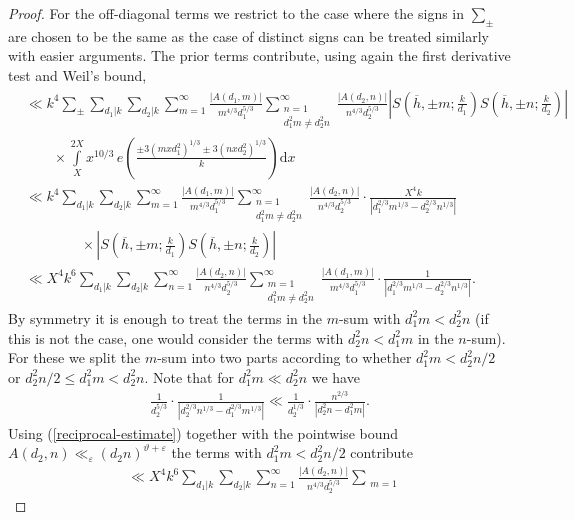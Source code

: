 \documentclass[a4paper,10pt,twoside]{amsart}
\theoremstyle{definition}
\numberwithin{equation}{section}
\renewcommand\:{\colon}
\begin{document}
\begin{proof}
For the off-diagonal terms we restrict to the case where the signs in $\sum_\pm$ are chosen to be the same as the case of distinct signs can be treated similarly with easier arguments. The prior terms contribute, using again the first derivative test and Weil's bound,
\begin{align*}
&\ll k^4\sum_\pm\sum_{d_1|k}\sum_{d_2|k}\sum_{m=1}^\infty\frac{\left|A(d_1,m)\right|}{m^{4/3}d_1^{5/3}}\sum_{\substack{n=1\\
d_1^2m\neq d_2^2n}}^\infty\frac{\left|A(d_2,n)\right|}{n^{4/3}d_2^{5/3}}\left|S\left(\overline h,\pm m;\frac k{d_1}\right)S\left(\overline h,\pm n;\frac k{d_2}\right)\right|\\
&\qquad\times\int\limits_X^{2X}x^{10/3}\,e\left(\frac{\pm 3(mx d_1^2)^{1/3}\pm 3(nxd_2^2)^{1/3}}k\right)\mathrm dx\\
&\ll k^4\sum_{d_1|k}\sum_{d_2|k}\sum_{m=1}^\infty\frac{\left|A(d_1,m)\right|}{m^{4/3}d_1^{5/3}}\sum_{\substack{n=1\\
d_1^2m\neq d_2^2n}}^\infty\frac{\left|A(d_2,n)\right|}{n^{4/3}d_2^{5/3}}\cdot\frac{X^{4}k}{\left|d_1^{2/3}m^{1/3}-d_2^{2/3}n^{1/3}\right|}\\
&\qquad\qquad\times\left|S\left(\overline h,\pm m;\frac k{d_1}\right)S\left(\overline h,\pm n;\frac k{d_2}\right)\right|\\
&\ll X^{4}k^6\sum_{d_1|k}\sum_{d_2|k}\sum_{n=1}^\infty\frac{\left|A(d_2,n)\right|}{n^{4/3}d_2^{5/3}}\sum_{\substack{m=1\\
d_1^2m\neq d_2^2n}}^\infty\frac{\left|A(d_1,m)\right|}{m^{4/3}d_1^{5/3}}\cdot\frac{1}{\left|d_1^{2/3}m^{1/3}-d_2^{2/3}n^{1/3}\right|}.
\end{align*}
By symmetry it is enough to treat the terms in the $m$-sum with $d_1^2m<d_2^2n$ (if this is not the case, one would consider the terms with $d_2^2n<d_1^2m$ in the $n$-sum). For these we split the $m$-sum into two parts according to whether $d_1^2m<d_2^2n/2$ or $d_2^2n/2\leq d_1^2m<d_2^2n$. Note that for $d_1^2m\ll d_2^2n$ we have 
\begin{align}\label{reciprocal-estimate}
\frac1{d_2^{5/3}}\cdot\frac1{|d_2^{2/3}n^{1/3}-d_1^{2/3}m^{1/3}|}\ll\frac1{d_2^{1/3}}\cdot\frac{n^{2/3}}{|d_2^2n-d_1^2m|}.
\end{align}
Using (\ref{reciprocal-estimate}) together with the pointwise bound $A(d_2,n)\ll_\varepsilon (d_2n)^{\vartheta+\varepsilon}$ the terms with $d_1^2m<d_2^2n/2$ contribute
\begin{align*}
&\ll X^{4}k^6\sum_{d_1|k}\sum_{d_2|k}\sum_{n=1}^\infty\frac{\left|A(d_2,n)\right|}{n^{4/3}d_2^{5/3}}\sum_{\substack{m=1\\
}}
\end{align*}
\end{proof}
\end{document}
